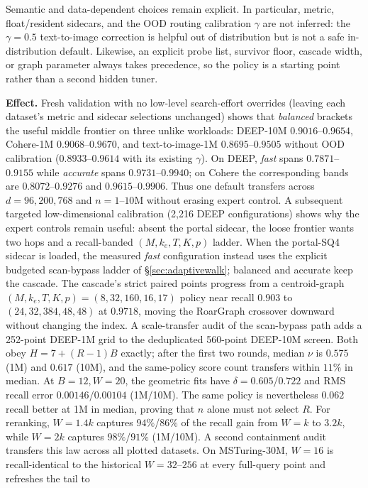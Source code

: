 \documentclass{article}
\newcommand{\effect}[1]{\par\smallskip\noindent\textbf{Effect.} #1}
\begin{document}
Semantic and data-dependent choices remain explicit. In particular, metric,
float/resident sidecars, and the OOD routing calibration $\gamma$ are not inferred:
the $\gamma{=}0.5$ text-to-image correction is helpful out of distribution but is
not a safe in-distribution default. Likewise, an explicit probe list, survivor
floor, cascade width, or graph parameter always takes precedence, so the policy is
a starting point rather than a second hidden tuner.
\effect{Fresh validation with no low-level search-effort overrides (leaving each
dataset's metric and sidecar selections unchanged) shows that \emph{balanced}
brackets the useful middle frontier on three unlike workloads: DEEP-10M
$0.9016$--$0.9654$, Cohere-1M $0.9068$--$0.9670$, and text-to-image-1M
$0.8695$--$0.9505$ without OOD calibration ($0.8933$--$0.9614$ with its existing
$\gamma$). On DEEP, \emph{fast} spans $0.7871$--$0.9155$ while \emph{accurate}
spans $0.9731$--$0.9940$; on Cohere the corresponding bands are
$0.8072$--$0.9276$ and $0.9615$--$0.9906$. Thus one default transfers across
$d{=}96,200,768$ and $n{=}1$--$10$M without erasing expert control. A subsequent
targeted low-dimensional calibration (2,216 DEEP configurations) shows why the
expert controls remain useful: absent the portal sidecar, the loose frontier wants
two hops and a recall-banded $(M,k_e,T,K,p)$ ladder. When the portal-SQ4 sidecar is
loaded, the measured \emph{fast} configuration instead uses the explicit
budgeted scan-bypass ladder of
\S\ref{sec:adaptivewalk}; balanced and accurate keep the cascade. The cascade's
strict paired points progress from a centroid-graph
$(M,k_e,T,K,p)=(8,32,160,16,17)$ policy near recall $0.903$ to
$(24,32,384,48,48)$ at $0.9718$, moving the RoarGraph crossover downward without
changing the index.  A scale-transfer audit of the scan-bypass path adds a
252-point DEEP-1M grid to the deduplicated 560-point DEEP-10M screen.  Both obey
$H=7+(R-1)B$ exactly; after the first two rounds, median $\nu$ is
$0.575$ (1M) and $0.617$ (10M), and the same-policy score count transfers within
$11\%$ in median.  At $B{=}12,W{=}20$, the geometric fits have
$\delta=0.605$/$0.722$ and RMS recall error $0.00146$/$0.00104$ (1M/10M).
The same policy is nevertheless $0.062$ recall better at 1M in median, proving
that $n$ alone must not select $R$.  For reranking, $W=1.4k$ captures
$94\%$/$86\%$ of the recall gain from $W=k$ to $3.2k$, while $W=2k$ captures
$98\%$/$91\%$ (1M/10M).  A second containment audit transfers this law across
all plotted datasets.  On MSTuring-30M, $W=16$ is recall-identical to the
historical $W=32$--$256$ at every full-query point and refreshes the tail to
}
\end{document}
